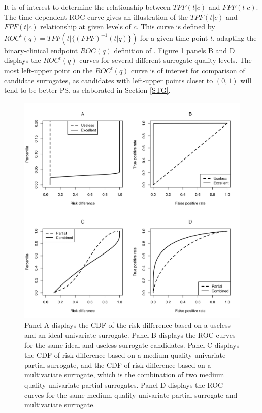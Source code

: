 \documentclass[times, doublespace]{simauth}
\begin{document}
It is of interest to determine the relationship between $TPF(t|c)$ and $FPF(t|c)$. The time-dependent ROC curve gives an illustration of the $TPF(t|c)$ and $FPF(t|c)$ relationship at given levels of $c$. This curve is defined by $ROC^{t}(q)=TPF(t|\{(FPF)^{-1}(t|q)\})$ for a given time point $t$, adapting the binary-clinical endpoint $ROC(q)$ definition of \citet{Huang12b}. Figure \ref{4panel} panels B and D displays the $ROC^{t}(q)$ curves for several different surrogate quality levels. The most left-upper point on the $ROC^{t}(q)$ curve is of interest for comparison of candidate surrogates, as candidates with left-upper points closer to $(0,1)$ will tend to be better PS, as elaborated in Section \ref{STG}.
\begin{figure}
\begin{center}
\includegraphics[scale=0.80]{Figure1.jpeg}
\end{center}
\caption{Panel A displays the CDF of the risk difference based on a useless and an ideal univariate surrogate. Panel B displays the ROC curves for the same ideal and useless surrogate candidates. Panel C displays the CDF of risk difference based on a medium quality univariate partial surrogate, and the CDF of risk difference based on a multivariate surrogate, which is the combination of two medium quality univariate partial surrogates. Panel D displays the ROC curves for the same medium quality univariate partial surrogate and multivariate surrogate. \label{4panel}}
\end{figure}
\end{document}
